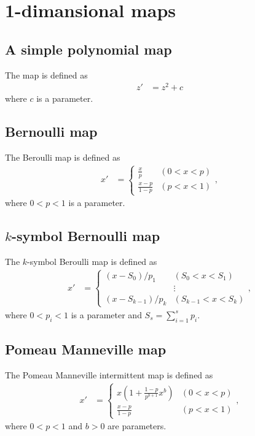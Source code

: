 \documentclass{article}
\begin{document}
\section*{1-dimansional maps}

\subsection*{A simple polynomial map}
The map is defined as
\begin{align*}
z'&=z^2+c
\end{align*}
where $c$ is a parameter.

\subsection*{Bernoulli map}
The Beroulli map is defined as
\begin{align*}
x'&=
\begin{cases}
\frac{x}{p}&(0<x<p)\\
\frac{x-p}{1-p}&(p<x<1)
\end{cases},
\end{align*}
where $0<p<1$ is a parameter.

\subsection*{$k$-symbol Bernoulli map}
The $k$-symbol Beroulli map is defined as
\begin{align*}
x'&=
\begin{cases}
(x-S_{0})/p_1&
(S_{0}<x<S_{1})\\
&\vdots\\
(x-S_{k-1})/p_k&
(S_{k-1}<x<S_{k})
\end{cases},
\end{align*}
where $0<p_i<1$ is a parameter and $ S_{s}=\sum_{i=1}^{s}p_i$.

\subsection*{Pomeau Manneville map}
The Pomeau Manneville intermittent map is defined as
\begin{align*}
x'&=
\begin{cases}
x\left( 1+\frac{1-p}{p^{b+1}}x^b\right) & (0<x<p)\\
\frac{x-p}{1-p}&(p<x<1)
\end{cases},
\end{align*}
where $0<p<1$ and $b>0$ are parameters.
\end{document}
